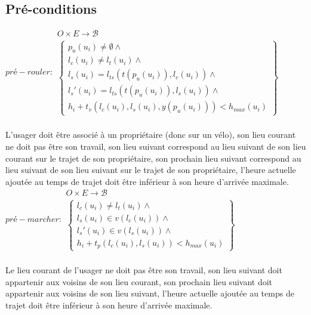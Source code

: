 \documentclass[french]{article}
\begin{document}
\subsection{Pré-conditions}
\noindent
$\displaystyle pré-rouler:\begin{matrix}
O\times E\rightarrow \mathcal{B}\\
\begin{Bmatrix}
p_{u}( u_{i}) \neq \emptyset \land \\
l_{c}( u_{i}) \neq l_{t}( u_{i}) \land \\
l_{s}( u_{i}) =l_{ts}( t( p_{u}( u_{i})) ,l_{c}( u_{i})) \land \\
l_{s} '( u_{i}) =l_{ts}( t( p_{u}( u_{i})) ,l_{s}( u_{i})) \land \\
h_{i} +t_{v}( l_{c}( u_{i}),l_{s}( u_{i}) ,y( p_{u}( u_{i}))) < h_{max}( u_{i})
\end{Bmatrix}
\end{matrix}$\\
\\
L'usager doit être associé à un propriétaire (donc sur un vélo), son lieu courant ne doit pas être son travail, son lieu suivant correspond au lieu suivant de son lieu courant sur le trajet de son propriétaire, son prochain lieu suivant correspond au lieu suivant de son lieu suivant sur le trajet de son propriétaire, l'heure actuelle ajoutée au temps de trajet doit être inférieur à son heure d'arrivée maximale.
\vspace*{0.5cm}
\\
$\displaystyle pré-marcher:\begin{matrix}
O\times E\rightarrow \mathcal{B}\\
\begin{Bmatrix}
l_{c}( u_{i}) \neq l_{t}( u_{i}) \land \\
l_{s}( u_{i}) \in v( l_{c}( u_{i})) \land \\
l_{s} '( u_{i}) \in v( l_{s}( u_{i})) \land \\
h_{i} +t_{p}( l_{c}( u_{i}) ,l_{s}( u_{i})) < h_{max}( u_{i})
\end{Bmatrix}
\end{matrix}$\\
\\
Le lieu courant de l'usager ne doit pas être son travail, son lieu suivant doit appartenir aux voisins de son lieu courant, son prochain lieu suivant doit appartenir aux voisins de son lieu suivant, l'heure actuelle ajoutée au temps de trajet doit être inférieur à son heure d'arrivée maximale.
\vspace*{0.5cm}
\end{document}
